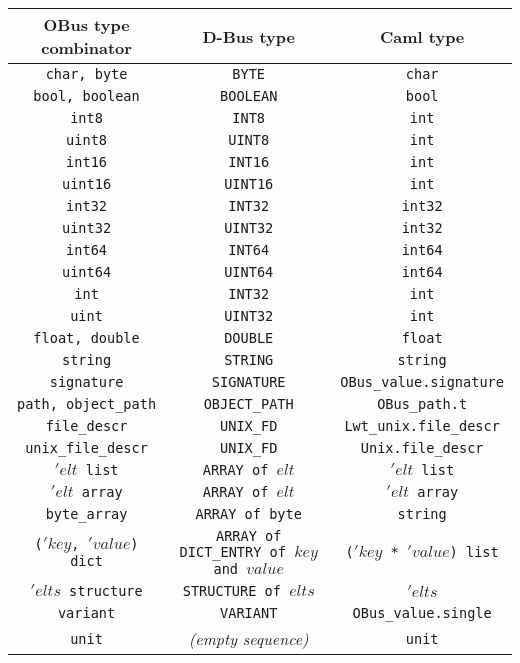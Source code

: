\documentclass{article}
\begin{document}
\begin{center}
  \begin{tabular}{|c|c|c|}
    \hline
    \textbf{OBus type combinator} & \textbf{D-Bus type} & \textbf{Caml type} \\
    \hline
    \texttt{char, byte} & \texttt{BYTE} & \texttt{char} \\
    \hline
    \texttt{bool, boolean} & \texttt{BOOLEAN} & \texttt{bool} \\
    \hline
    \texttt{int8} & \texttt{INT8} & \texttt{int} \\
    \hline
    \texttt{uint8} & \texttt{UINT8} & \texttt{int} \\
    \hline
    \texttt{int16} & \texttt{INT16} & \texttt{int} \\
    \hline
    \texttt{uint16} & \texttt{UINT16} & \texttt{int} \\
    \hline
    \texttt{int32} & \texttt{INT32} & \texttt{int32} \\
    \hline
    \texttt{uint32} & \texttt{UINT32} & \texttt{int32} \\
    \hline
    \texttt{int64} & \texttt{INT64} & \texttt{int64} \\
    \hline
    \texttt{uint64} & \texttt{UINT64} & \texttt{int64} \\
    \hline
    \texttt{int} & \texttt{INT32} & \texttt{int} \\
    \hline
    \texttt{uint} & \texttt{UINT32} & \texttt{int} \\
    \hline
    \texttt{float, double} & \texttt{DOUBLE} & \texttt{float} \\
    \hline
    \texttt{string} & \texttt{STRING} & \texttt{string} \\
    \hline
    \texttt{signature} & \texttt{SIGNATURE} & \texttt{OBus\_value.signature} \\
    \hline
    \texttt{path, object\_path} & \texttt{OBJECT\_PATH} & \texttt{OBus\_path.t} \\
    \hline
    \texttt{file\_descr} & \texttt{UNIX\_FD} & \texttt{Lwt\_unix.file\_descr} \\
    \hline
    \texttt{unix\_file\_descr} & \texttt{UNIX\_FD} & \texttt{Unix.file\_descr} \\
    \hline
    \texttt{$'elt$ list} & \texttt{ARRAY of $elt$} & \texttt{$'elt$ list} \\
    \hline
    \texttt{$'elt$ array} & \texttt{ARRAY of $elt$} & \texttt{$'elt$ array} \\
    \hline
    \texttt{byte\_array} & \texttt{ARRAY of byte} & \texttt{string} \\
    \hline
    \texttt{($'key$, $'value$) dict} & \texttt{ARRAY of DICT\_ENTRY of $key$ and $value$} & \texttt{($'key$ * $'value$) list} \\
    \hline
    \texttt{$'elts$ structure} & \texttt{STRUCTURE of $elts$} & \texttt{$'elts$} \\
    \hline
    \texttt{variant} & \texttt{VARIANT} & \texttt{OBus\_value.single} \\
    \hline
    \texttt{unit} & \textit{(empty sequence)} & \texttt{unit} \\
    \hline
  \end{tabular}
\end{center}
\end{document}
